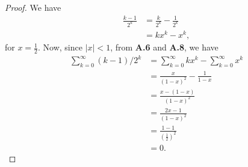 \begin{proof}
  We have
  \begin{equation*}
    \begin{split}
      \frac{k - 1}{2^k} &= \frac{k}{2^k} - \frac{1}{2^k} \\
      &= kx^k - x^k,
    \end{split}
  \end{equation*}
  for $x = \frac{1}{2}$. Now, since $\lvert x \rvert < 1$, from \textbf{A.6}
  and \textbf{A.8}, we have
  \begin{equation*}
    \begin{split}
      \sum_{k = 0}^\infty (k - 1) / 2^k
      &= \sum_{k = 0}^\infty kx^k - \sum_{k = 0}^\infty x^k \\
      &= \frac{x}{{(1 - x)}^2} - \frac{1}{1 - x} \\
      &= \frac{x - (1 - x)}{{(1 - x)}^2} \\
      &= \frac{2x - 1}{{(1 - x)}^2} \\
      &= \frac{1 - 1}{{(\frac{1}{2})}^2} \\
      &= 0.
    \end{split}
  \end{equation*}
\end{proof}
